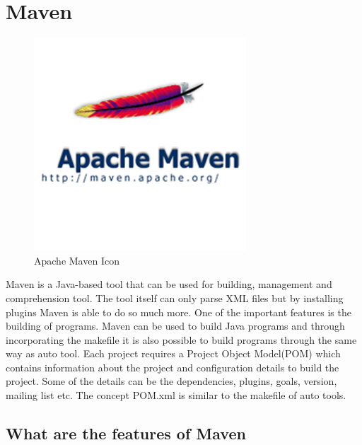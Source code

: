 \chapter{Maven}

\begin{figure}
 \vspace{-20pt}
  \begin{centering}
  \includegraphics[scale=0.5]{apache-maven.jpg}
  \end{centering}
  \vspace{-40pt}
   \caption{Apache Maven Icon}
  \label{fig:maven1}
\end{figure}
Maven is a Java-based tool that can be used for building, management and comprehension tool. The tool itself can only parse XML files but by installing plugins Maven is able to do so much more. One of the important features is the building of programs. Maven can be used to build Java programs and through incorporating the makefile it is also possible to build programs through the same way as auto tool. Each project requires a Project Object Model(POM) which contains information about the project and configuration details to build the project. Some of the details can be the dependencies, plugins, goals, version, mailing list etc. The concept POM.xml is similar to the makefile of auto tools.

\section{What are the features of Maven}

